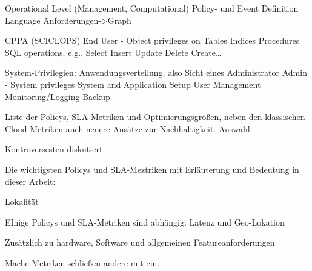 Operational Level (Management, Computational)
Policy- und Event Definition Language
Anforderungen->Graph

CPPA (SCICLOPS) End User - Object privileges on 
Tables 
Indices 
Procedures 
SQL operations, e.g.,  
Select 
Insert 
Update 
Delete 
Create… 

System-Privilegien: Anwendungsverteilung, also Sicht eines Administrator
Admin - System privileges 
	System and Application Setup 
	User Management
	Monitoring/Logging
	Backup
	
Liste der Policys, SLA-Metriken und Optimierungsgrößen, neben den klassischen Cloud-Metriken auch neuere Ansätze zur Nachhaltigkeit. Auswahl:

Kontroversesten diskutiert

Die wichtigsten Policys und SLA-Meztriken mit Erläuterung und Bedeutung in dieser Arbeit:


Lokalität

EInige Policys und SLA-Metriken sind abhängig: Latenz und Geo-Lokation


Zusätzlich zu hardware, Software und allgemeinen Featureanforderungen

Mache Metriken schließen andere mit ein.

